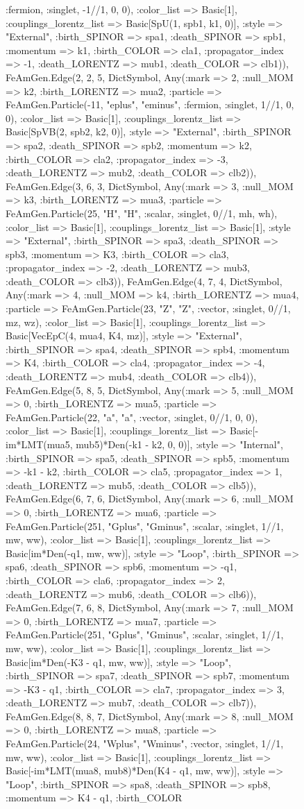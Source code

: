 \documentclass{revtex4}
\begin{document}
\begin{figure}[!htb]
\begin{center}
{:fermion, :singlet, -1//1, 0, 0), :color_list => Basic[1], :couplings_lorentz_list => Basic[SpU(1, spb1, k1, 0)], :style => "External", :birth_SPINOR => spa1, :death_SPINOR => spb1, :momentum => k1, :birth_COLOR => cla1, :propagator_index => -1, :death_LORENTZ => mub1, :death_COLOR => clb1)), FeAmGen.Edge(2, 2, 5, Dict{Symbol, Any}(:mark => 2, :null_MOM => k2, :birth_LORENTZ => mua2, :particle => FeAmGen.Particle(-11, "eplus", "eminus", :fermion, :singlet, 1//1, 0, 0), :color_list => Basic[1], :couplings_lorentz_list => Basic[SpVB(2, spb2, k2, 0)], :style => "External", :birth_SPINOR => spa2, :death_SPINOR => spb2, :momentum => k2, :birth_COLOR => cla2, :propagator_index => -3, :death_LORENTZ => mub2, :death_COLOR => clb2)), FeAmGen.Edge(3, 6, 3, Dict{Symbol, Any}(:mark => 3, :null_MOM => k3, :birth_LORENTZ => mua3, :particle => FeAmGen.Particle(25, "H", "H", :scalar, :singlet, 0//1, mh, wh), :color_list => Basic[1], :couplings_lorentz_list => Basic[1], :style => "External", :birth_SPINOR => spa3, :death_SPINOR => spb3, :momentum => K3, :birth_COLOR => cla3, :propagator_index => -2, :death_LORENTZ => mub3, :death_COLOR => clb3)), FeAmGen.Edge(4, 7, 4, Dict{Symbol, Any}(:mark => 4, :null_MOM => k4, :birth_LORENTZ => mua4, :particle => FeAmGen.Particle(23, "Z", "Z", :vector, :singlet, 0//1, mz, wz), :color_list => Basic[1], :couplings_lorentz_list => Basic[VecEpC(4, mua4, K4, mz)], :style => "External", :birth_SPINOR => spa4, :death_SPINOR => spb4, :momentum => K4, :birth_COLOR => cla4, :propagator_index => -4, :death_LORENTZ => mub4, :death_COLOR => clb4)), FeAmGen.Edge(5, 8, 5, Dict{Symbol, Any}(:mark => 5, :null_MOM => 0, :birth_LORENTZ => mua5, :particle => FeAmGen.Particle(22, "a", "a", :vector, :singlet, 0//1, 0, 0), :color_list => Basic[1], :couplings_lorentz_list => Basic[-im*LMT(mua5, mub5)*Den(-k1 - k2, 0, 0)], :style => "Internal", :birth_SPINOR => spa5, :death_SPINOR => spb5, :momentum => -k1 - k2, :birth_COLOR => cla5, :propagator_index => 1, :death_LORENTZ => mub5, :death_COLOR => clb5)), FeAmGen.Edge(6, 7, 6, Dict{Symbol, Any}(:mark => 6, :null_MOM => 0, :birth_LORENTZ => mua6, :particle => FeAmGen.Particle(251, "Gplus", "Gminus", :scalar, :singlet, 1//1, mw, ww), :color_list => Basic[1], :couplings_lorentz_list => Basic[im*Den(-q1, mw, ww)], :style => "Loop", :birth_SPINOR => spa6, :death_SPINOR => spb6, :momentum => -q1, :birth_COLOR => cla6, :propagator_index => 2, :death_LORENTZ => mub6, :death_COLOR => clb6)), FeAmGen.Edge(7, 6, 8, Dict{Symbol, Any}(:mark => 7, :null_MOM => 0, :birth_LORENTZ => mua7, :particle => FeAmGen.Particle(251, "Gplus", "Gminus", :scalar, :singlet, 1//1, mw, ww), :color_list => Basic[1], :couplings_lorentz_list => Basic[im*Den(-K3 - q1, mw, ww)], :style => "Loop", :birth_SPINOR => spa7, :death_SPINOR => spb7, :momentum => -K3 - q1, :birth_COLOR => cla7, :propagator_index => 3, :death_LORENTZ => mub7, :death_COLOR => clb7)), FeAmGen.Edge(8, 8, 7, Dict{Symbol, Any}(:mark => 8, :null_MOM => 0, :birth_LORENTZ => mua8, :particle => FeAmGen.Particle(24, "Wplus", "Wminus", :vector, :singlet, 1//1, mw, ww), :color_list => Basic[1], :couplings_lorentz_list => Basic[-im*LMT(mua8, mub8)*Den(K4 - q1, mw, ww)], :style => "Loop", :birth_SPINOR => spa8, :death_SPINOR => spb8, :momentum => K4 - q1, :birth_COLOR }
\end{center}
\end{figure}
\end{document}
